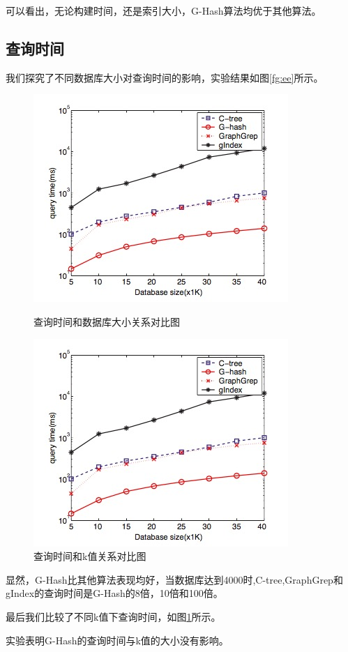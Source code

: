 \documentclass{article}
\begin{document}
可以看出，无论构建时间，还是索引大小，G-Hash算法均优于其他算法。
\subsection{查询时间}
我们探究了不同数据库大小对查询时间的影响，实验结果如图\ref{fg:ee}所示。
\begin{figure}[htb]
    \centering
    \begin{minipage}[t]{0.5\textwidth}
        \centering
        \includegraphics[width=\textwidth]{qt}
        \caption{查询时间和数据库大小关系对比图}
        \label{fg:ee}
    \end{minipage}%
    \begin{minipage}[t]{0.5\textwidth}
        \centering
         \includegraphics[width=\textwidth]{qt}
        \caption{查询时间和k值关系对比图}
        \label{fg:ek}
    \end{minipage}

\end{figure}

显然，G-Hash比其他算法表现均好，当数据库达到4000时,C-tree,GraphGrep和gIndex的查询时间是G-Hash的8倍，10倍和100倍。

最后我们比较了不同k值下查询时间，如图\ref{fg:ek}所示。


实验表明G-Hash的查询时间与k值的大小没有影响。

\ifx\allfiles\undefined
%
%
\end{document}

